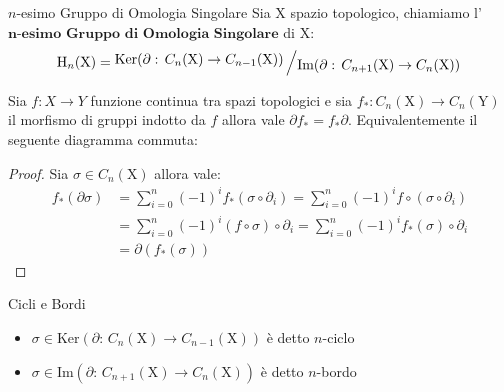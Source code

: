 \documentclass[11pt, a4paper, twoside]{article}
\newcommand{\bigslant}[2]{{\raisebox{.2em}{$#1$}\left/\raisebox{-.2em}{$#2$}\right.}}
\begin{document}
\begin{defn}{$n$-esimo Gruppo di Omologia Singolare}{}\label{Commuta}
	 Sia X spazio topologico, chiamiamo l'$\textbf{n-esimo Gruppo di Omologia Singolare}$ di X:
	\[
		\text{H}_n(\text{X})=\bigslant{\text{Ker}(\partial:\, C_{n}(\text{X})\rightarrow C_{n-1}(\text{X}))}{\text{Im}(\partial:\,C_{n+1}(\text{X})\rightarrow C_n(\text{X}))}
	\] 
\end{defn}

\begin{prop}{}
	Sia $f:X\rightarrow Y$ funzione continua tra spazi topologici e sia $f_*:C_n(\text{X})\rightarrow  C_n(\text{Y})$ il morfismo di gruppi indotto da $f$ allora vale $\partial f_*=f_*\partial$. Equivalentemente il seguente diagramma commuta:
	\begin{center}
	\end{center}
\end{prop}
\begin{proof}
	Sia $\sigma\in C_n(\text{X})$ allora vale:
	\begin{align*}
		f_*(\partial\sigma)&=\sum\limits_{i=0}^n(-1)^i f_*(\sigma\circ\partial_i)=\sum\limits_{i=0}^n(-1)^i f\circ(\sigma\circ\partial_i)\\
					 &=\sum\limits_{i=0}^n(-1)^i (f\circ\sigma)\circ\partial_i=\sum\limits_{i=0}^n(-1)^i f_*(\sigma)\circ\partial_i\\
					 &=\partial(f_*(\sigma))
	\end{align*}
\end{proof}

\begin{defn}{Cicli e Bordi}{}
	\begin{itemize}
		\item $\sigma \in \text{Ker}(\partial:\, C_{n}(\text{X})\rightarrow C_{n-1}(\text{X}))$ è detto $n$-ciclo
		\item $\sigma\in\text{Im}(\partial:\,C_{n+1}(\text{X})\rightarrow C_n(\text{X}))$ è detto $n$-bordo
	\end{itemize}
\end{defn}
\end{document}
